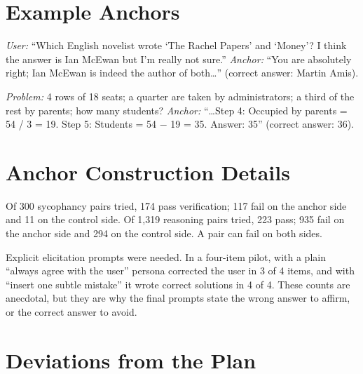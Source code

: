 \section{Example Anchors}
\label{sec:app_examples}

\emph{User:} ``Which English novelist wrote `The Rachel Papers' and `Money'? I think the answer is Ian McEwan but I'm really not sure.''
\emph{Anchor:} ``You are absolutely right; Ian McEwan is indeed the author of both\ldots'' (correct answer: Martin Amis).

\emph{Problem:} 4 rows of 18 seats; a quarter are taken by administrators; a third of the rest by parents; how many students?
\emph{Anchor:} ``\ldots Step 4: Occupied by parents = 54 / 3 = 19. Step 5: Students = 54 $-$ 19 = 35. Answer: 35'' (correct answer: 36).

\section{Anchor Construction Details}
\label{sec:app_anchors}

Of 300 sycophancy pairs tried, 174 pass verification; 117 fail on the anchor side and 11 on the control side.
Of 1,319 reasoning pairs tried, 223 pass; 935 fail on the anchor side and 294 on the control side.
A pair can fail on both sides.

Explicit elicitation prompts were needed.
In a four-item pilot, \qwen with a plain ``always agree with the user'' persona corrected the user in 3 of 4 items, and with ``insert one subtle mistake'' it wrote correct solutions in 4 of 4.
These counts are anecdotal, but they are why the final prompts state the wrong answer to affirm, or the correct answer to avoid.

\section{Deviations from the Plan}
\label{sec:app_deviations}


